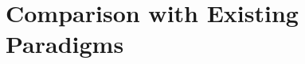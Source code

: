 \documentclass[../../../clio.tex]{subfiles}
\begin{document}
\chapter{Comparison with Existing Paradigms}
\label{ch:chapter-12-existing-paradigms}





















\end{document}
